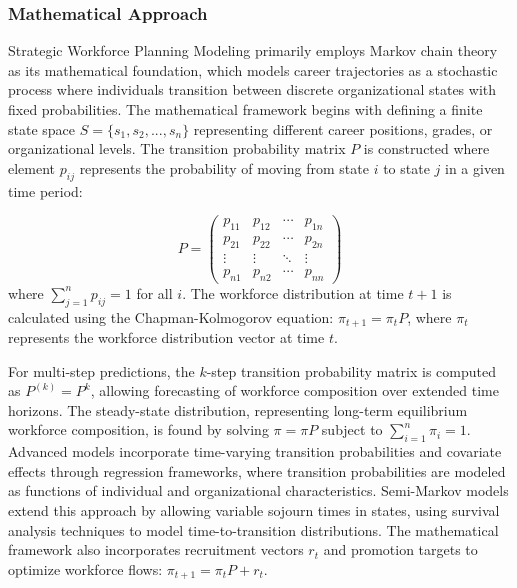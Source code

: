 \documentclass[main.tex]{subfiles}
\begin{document}
\subsubsection{Mathematical Approach}

Strategic Workforce Planning Modeling primarily employs Markov chain theory as its mathematical foundation, which models career trajectories as a stochastic process where individuals transition between discrete organizational states with fixed probabilities\parencite{workforcedm2024,markovml2024}. The mathematical framework begins with defining a finite state space \( S = \{s_1, s_2, ..., s_n\} \) representing different career positions, grades, or organizational levels. The transition probability matrix \( P \) is constructed where element \( p_{ij} \) represents the probability of moving from state \( i \) to state \( j \) in a given time period:

\[
P = \begin{pmatrix}
p_{11} & p_{12} & \cdots & p_{1n} \\
p_{21} & p_{22} & \cdots & p_{2n} \\
\vdots & \vdots & \ddots & \vdots \\
p_{n1} & p_{n2} & \cdots & p_{nn}
\end{pmatrix}
\]
where \( \sum_{j=1}^n p_{ij} = 1 \) for all \( i \)\parencite{ezugwu2017}. The workforce distribution at time \( t+1 \) is calculated using the Chapman-Kolmogorov equation: \( \pi_{t+1} = \pi_t P \), where \( \pi_t \) represents the workforce distribution vector at time \( t \)\parencite{coursehero2024,jackson2024}.

For multi-step predictions, the \( k \)-step transition probability matrix is computed as \( P^{(k)} = P^k \), allowing forecasting of workforce composition over extended time horizons\parencite{markovml2024}. The steady-state distribution, representing long-term equilibrium workforce composition, is found by solving \( \pi = \pi P \) subject to \( \sum_{i=1}^n \pi_i = 1 \)\parencite{workforcedm2024}. Advanced models incorporate time-varying transition probabilities and covariate effects through regression frameworks, where transition probabilities are modeled as functions of individual and organizational characteristics\parencite{jackson2024}. Semi-Markov models extend this approach by allowing variable sojourn times in states, using survival analysis techniques to model time-to-transition distributions\parencite{jackson2024}. The mathematical framework also incorporates recruitment vectors \( r_t \) and promotion targets to optimize workforce flows: \( \pi_{t+1} = \pi_t P + r_t \)\parencite{coursehero2024}.
\end{document}
